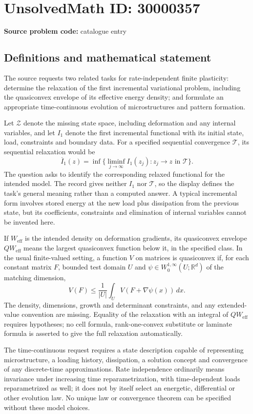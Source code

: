 \documentclass[11pt]{article}
\newcommand{\R}{\mathbb{R}}
\begin{document}
\section*{UnsolvedMath ID: 30000357}
\textbf{Source problem code:} catalogue entry
\subsection{Definitions and mathematical statement}
The source requests two related tasks for rate-independent finite plasticity: determine the relaxation of the first incremental variational problem, including the quasiconvex envelope of its effective energy density; and formulate an appropriate time-continuous evolution of microstructures and pattern formation.

Let \(\mathcal Z\) denote the missing state space, including deformation and any internal variables, and let \(I_1\) denote the first incremental functional with its initial state, load, constraints and boundary data. For a specified sequential convergence \(\mathcal T\), its sequential relaxation would be
\[
 \overline I_1(z)=\inf\{\liminf_{j\to\infty}I_1(z_j):z_j\to z\text{ in }\mathcal T\}.
\]
The question asks to identify the corresponding relaxed functional for the intended model. The record gives neither \(I_1\) nor \(\mathcal T\), so the display defines the task's general meaning rather than a computed answer. A typical incremental form involves stored energy at the new load plus dissipation from the previous state, but its coefficients, constraints and elimination of internal variables cannot be invented here.

If \(W_{\mathrm{eff}}\) is the intended density on deformation gradients, its quasiconvex envelope \(QW_{\mathrm{eff}}\) means the largest quasiconvex function below it, in the specified class. In the usual finite-valued setting, a function \(V\) on matrices is quasiconvex if, for each constant matrix \(F\), bounded test domain \(U\) and \(\psi\in W^{1,\infty}_0(U;\R^d)\) of the matching dimension,
\[
 V(F)\leq\frac1{|U|}\int_U V(F+\nabla\psi(x))\,dx.
\]
The density, dimensions, growth and determinant constraints, and any extended-value convention are missing. Equality of the relaxation with an integral of \(QW_{\mathrm{eff}}\) requires hypotheses; no cell formula, rank-one-convex substitute or laminate formula is asserted to give the full relaxation automatically.

The time-continuous request requires a state description capable of representing microstructure, a loading history, dissipation, a solution concept and convergence of any discrete-time approximations. Rate independence ordinarily means invariance under increasing time reparametrization, with time-dependent loads reparametrized as well; it does not by itself select an energetic, differential or other evolution law. No unique law or convergence theorem can be specified without these model choices.
\end{document}
